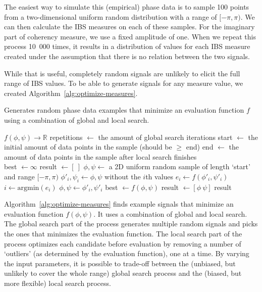 The easiest way to simulate this (empirical) phase data is to sample 100 points
from a two-dimensional uniform random distribution with a range of
$[-\pi, \pi)$. We can then calculate the IBS measures on each of these samples.
For the imaginary part of coherency measure, we use a fixed amplitude of one.
When we repeat this process 10~000 times, it results in a distribution of values
for each IBS measure created under the assumption that there is no relation
between the two signals.

While that is useful, completely random signals are unlikely to elicit the full
range of IBS values. To be able to generate signals for any measure
value, we created Algorithm~\ref{alg:optimize-measures}.

\begin{algorithm}
  \caption{Generates random phase data examples that minimize an evaluation function $f$ using a combination of global and local search.}
  \begin{algorithmic}
  \Require $f(\phi, \psi) \to \mathbb{R}$ 
  \State repetitions $\gets$ the amount of global search iterations
  \State start $\gets$ the initial amount of data points in the sample (should be $\geq$ end)
  \State end $\gets$ the amount of data points in the sample after local search finishes
  \\
  \State best $\gets \infty$
  \State result $\gets [~]$
   
    \State $\phi, \psi \gets$ a 2D uniform random sample of length `start' and range $[-\pi, \pi)$
     
        \State $\phi'_i, \psi_i \gets \phi, \psi$ without the $i$th values
        \State $e_i \gets f(\phi'_i, \psi'_i)$
      \EndFor
      \State $i \gets \text{argmin}(e_i)$
      \State $\phi, \psi \gets \phi'_i, \psi'_i$
    \EndWhile
      \State best $\gets f(\phi, \psi)$
      \State result $\gets [\phi~\psi]$
    \EndIf
  \EndFor
  \State\Return result
  \end{algorithmic}
  \label{alg:optimize-measures}
\end{algorithm}

Algorithm~\ref{alg:optimize-measures} finds example signals that minimize an
evaluation function $f(\phi, \psi)$. It uses a combination of global and local
search. The global search part of the process generates multiple random signals
and picks the ones that minimizes the evaluation function. The local search part
of the process optimizes each candidate before evaluation by removing a number
of `outliers' (as determined by the evaluation function), one at a time. By
varying the input parameters, it is possible to trade-off between the (unbiased,
but unlikely to cover the whole range) global search process and the (biased,
but more flexible) local search process.

